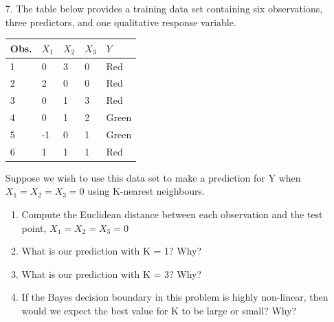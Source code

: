     \documentclass[12pt,fleqn,a4paper]{article}
\theoremstyle{definition}
\theoremstyle{plain}
\begin{document}
\begin{enumerate}
\item[7.] The table below provides a training data set containing six observations, three predictors, and one qualitative response variable.

\begin{table}[H]
\centering
\begin{tabular}{lllll}
Obs.  & $X_{1}$    & $X_{2}$     & $X_{3}$  & $Y$ \\
\toprule
1 & 0 & 3 & 0 & Red \\
2 & 2 & 0 & 0 & Red \\
3 & 0 & 1 & 3 & Red \\
4 & 0 & 1 & 2 & Green \\
5 & -1 & 0 & 1 & Green \\
6 & 1 & 1 & 1 & Red \\
\bottomrule
\end{tabular}
\end{table}
Suppose we wish to use this data set to make a prediction for Y when $X_{1} = X_{2} = X_{3} = 0$ using K-nearest neighbours.
    \begin{enumerate}
        \item Compute the Euclidean distance between each observation and the test point, $X_{1} = X_{2} = X_{3} = 0$
        \item What is our prediction with K = 1? Why?
        \item What is our prediction with K = 3? Why?
        \item If the Bayes decision boundary in this problem is highly non-linear, then would we expect the best value for K to be large or small? Why?
    \end{enumerate}
\end{enumerate}
\end{document}
